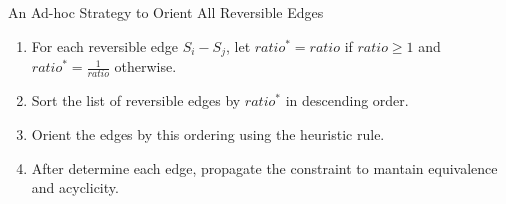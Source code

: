 \documentclass[hyperref={pdfpagelabels=false}]{beamer}
\begin{document}
\begin{frame}{An Ad-hoc Strategy to Orient All Reversible Edges}
	
	\begin{enumerate}\small
		\item For each reversible edge $S_i-S_j$, let $ratio^*=ratio$ if $ratio \ge 1$ and $ratio^*=\frac{1}{ratio}$ otherwise. 
		\item Sort the list of reversible edges by $ratio^*$ in descending order. 
		\item Orient the edges by this ordering using the heuristic rule.
		\item After determine each edge, propagate the constraint to mantain equivalence and acyclicity.
	\end{enumerate}	
	

\end{frame}
\end{document}
